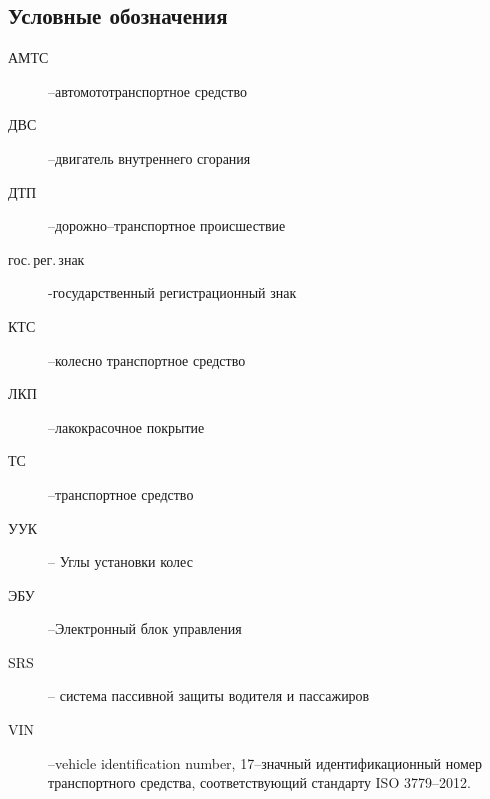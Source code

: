\subsection{Условные обозначения}
\begin{description}
%	 
\item[АМТС] --автомототранспортное средство
\item[ДВС] --двигатель внутреннего сгорания
\item[ДТП] --дорожно--транспортное происшествие
\item[гос.\,рег.\,знак] -государственный регистрационный знак
\item[КТС] --колесно транспортное средство 
\item[ЛКП] --лакокрасочное покрытие
\item[ТС] --транспортное средство
\item[УУК] -- Углы установки колес
\item[ЭБУ] --Электронный блок управления
\item[SRS] -- система пассивной защиты водителя и пассажиров
\item[VIN] --vehicle identification number, 17--значный идентификационный номер транспортного средства, соответствующий стандарту ISO 3779--2012.
%
\end{description}
%
